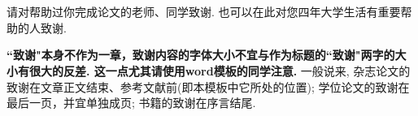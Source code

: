 \documentclass[notitlepage,cs4size,punct,oneside]{ctexrep}
\numberwithin{equation}{chapter}
\theoremstyle{mystyle}
\begin{document}


\chapter*{}

请对帮助过你完成论文的老师、同学致谢. 也可以在此对您四年大学生活有重要帮助的人致谢.

\textbf{``致谢"本身不作为一章，致谢内容的字体大小不宜与作为标题的``致谢"两字的大小有很大的反差. 这一点尤其请使用word模板的同学注意. } 一般说来, 杂志论文的致谢在文章正文结束、参考文献前(即本模板中它所处的位置);  学位论文的致谢在最后一页，并宜单独成页; 书籍的致谢在序言结尾.


\end{document}
